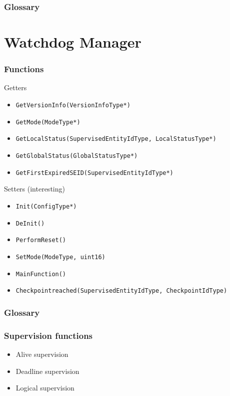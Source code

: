\documentclass{beamer}
\newcommand{\gloss}[1]{
\begin{frame}
  \frametitle{Glossary}
  \begin{description}
    \item [Supervised Entity]
    \item<#1->[Checkpoint]
    \item [Mode]
  \end{description}
\end{frame}
}
\begin{document}
\gloss{1}

\section{Watchdog Manager}
\begin{frame}[fragile]
  \frametitle{Functions}
  \begin{block}{Getters}
    \begin{itemize}
      \item \lstinline!GetVersionInfo(VersionInfoType*)!
      \item \lstinline!GetMode(ModeType*)!
      \item \lstinline!GetLocalStatus(SupervisedEntityIdType, LocalStatusType*)!
      \item \lstinline!GetGlobalStatus(GlobalStatusType*)!
      \item \lstinline!GetFirstExpiredSEID(SupervisedEntityIdType*)!
    \end{itemize}
  \end{block}

  \begin{block}{Setters (interesting)}
    \begin{itemize}
      \item \lstinline!Init(ConfigType*)!
      \item \lstinline!DeInit()!
      \item \lstinline!PerformReset()!
      \item \lstinline!SetMode(ModeType, uint16)!
      \item \lstinline!MainFunction()!
      \item \lstinline!Checkpointreached(SupervisedEntityIdType, CheckpointIdType)!
    \end{itemize}
  \end{block}
\end{frame}

\gloss{2}

\begin{frame}
  \frametitle{Supervision functions}
  \begin{itemize}
    \item Alive supervision
    \item Deadline supervision
    \item Logical supervision
  \end{itemize}
\end{frame}
\end{document}

